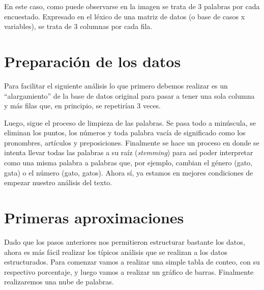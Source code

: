 \documentclass[
  letterpaper,
  DIV=11,
  numbers=noendperiod]{scrreprt}
\begin{document}
En este caso, como puede observarse en la imagen se trata de 3 palabras
por cada encuestado. Expresado en el léxico de una matriz de datos (o
base de casos x variables), se trata de 3 columnas por cada fila.

\hypertarget{preparaciuxf3n-de-los-datos}{%
\section{Preparación de los datos}\label{preparaciuxf3n-de-los-datos}}

Para facilitar el siguiente análisis lo que primero debemos realizar es
un ``alargamiento'' de la base de datos original para pasar a tener una
sola columna y más filas que, en principio, se repetirían 3 veces.

Luego, sigue el proceso de limpieza de las palabras. Se pasa todo a
minúscula, se eliminan los puntos, los números y toda palabra vacía de
significado como los pronombres, artículos y preposiciones. Finalmente
se hace un proceso en donde se intenta llevar todas las palabras a su
raíz (\emph{stemming}) para así poder interpretar como una misma palabra
a palabras que, por ejemplo, cambian el género (gato, gata) o el número
(gato, gatos). Ahora sí, ya estamos en mejores condiciones de empezar
nuestro análisis del texto.

\hypertarget{primeras-aproximaciones}{%
\section{Primeras aproximaciones}\label{primeras-aproximaciones}}

Dado que los pasos anteriores nos permitieron estructurar bastante los
datos, ahora es más fácil realizar los típicos análisis que se realizan
a los datos estructurados. Para comenzar vamos a realizar una simple
tabla de conteo, con su respectivo porcentaje, y luego vamos a realizar
un gráfico de barras. Finalmente realizaremos una nube de palabras.
\end{document}

